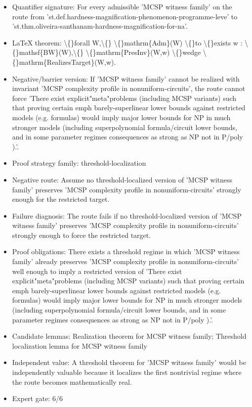 \documentclass[11pt]{article}
\begin{document}
\begin{itemize}
\item Quantifier signature: For every admissible 'MCSP witness family' on the route from 'st.def.hardness-magnification-phenomenon-programme-leve' to 'st.thm.oliveira-santhanam-hardness-magnification-for-na'.
\item LaTeX theorem: \textbackslash\{\}forall W,\textbackslash\{\} \textbackslash\{\}mathrm\{Adm\}(W) \textbackslash\{\}to \textbackslash\{\}exists w : \textbackslash\{\}mathsf\{BW\}(W),\textbackslash\{\} \textbackslash\{\}mathrm\{PresInv\}(W,w) \textbackslash\{\}wedge \textbackslash\{\}mathrm\{RealizesTarget\}(W,w).
\item Negative/barrier version: If 'MCSP witness family' cannot be realized with invariant 'MCSP complexity profile in nonuniform-circuits', the route cannot force 'There exist explicit"meta"problems (including MCSP variants) such that proving certain emph barely-superlinear lower bounds against restricted models (e.g. formulas) would imply major lower bounds for NP in much stronger models (including superpolynomial formula/circuit lower bounds, and in some parameter regimes consequences as strong as NP not in P/poly ).'.
\item Proof strategy family: threshold-localization
\item Negative route: Assume no threshold-localized version of 'MCSP witness family' preserves 'MCSP complexity profile in nonuniform-circuits' strongly enough for the restricted target.
\item Failure diagnosis: The route fails if no threshold-localized version of 'MCSP witness family' preserves 'MCSP complexity profile in nonuniform-circuits' strongly enough to force the restricted target.
\item Proof obligations: There exists a threshold regime in which 'MCSP witness family' already preserves 'MCSP complexity profile in nonuniform-circuits' well enough to imply a restricted version of 'There exist explicit"meta"problems (including MCSP variants) such that proving certain emph barely-superlinear lower bounds against restricted models (e.g. formulas) would imply major lower bounds for NP in much stronger models (including superpolynomial formula/circuit lower bounds, and in some parameter regimes consequences as strong as NP not in P/poly ).'.
\item Candidate lemmas: Realization theorem for MCSP witness family; Threshold localization lemma for MCSP witness family
\item Independent value: A threshold theorem for 'MCSP witness family' would be independently valuable because it localizes the first nontrivial regime where the route becomes mathematically real.
\item Expert gate: 6/6
\end{itemize}
\end{document}
